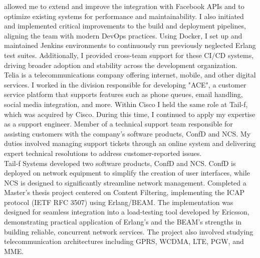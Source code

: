 \documentclass[purpleprocv]{procv}
\begin{document}
\begin{procv-twocolumns}
{{          allowed me to extend and improve the integration with Facebook APIs and to 
          optimize existing systems for performance and maintainability. I also initiated and implemented critical improvements 
          to the build and deployment pipelines, aligning the team with modern DevOps practices. Using Docker, I set up 
          and maintained Jenkins environments to continuously run previously neglected Erlang test suites. Additionally, I 
          provided cross-team support for these CI/CD systems, driving 
          broader adoption and stability across the development organization.
          \\[3pt]
          Telia is a telecommunications company offering internet, mobile, and other digital services. I worked 
          in the division responsible for developing "ACE", a customer service platform that supports features 
          such as phone queues, email handling, social media integration, and more.}
          {Within Cisco I held the same role at Tail-f, which was acquired by Cisco. During this time, 
          I continued to apply my expertise as a support engineer.}
          {Member of a technical support team responsible for assisting customers with the company’s software 
          products, ConfD and NCS. My duties involved managing support tickets through an online system and delivering expert 
          technical resolutions to address customer-reported issues.
          \\[3pt]
          Tail-f Systems developed two software products, ConfD and NCS. ConfD is deployed on network equipment to simplify 
          the creation of user interfaces, while NCS is designed to significantly streamline network management.}
          {Completed a Master’s thesis project centered on Content Filtering, implementing the ICAP protocol (IETF RFC 3507) 
          using Erlang/BEAM. The implementation was designed for seamless integration into a load-testing tool developed by 
          Ericsson, demonstrating practical application of Erlang’s and the BEAM’s strengths in building reliable, concurrent 
          network services. The project also involved studying telecommunication architectures including GPRS, WCDMA, 
          LTE, PGW, and MME.
}}
\end{procv-twocolumns}
\end{document}
